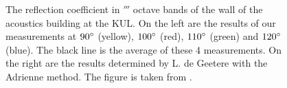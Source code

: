 \begin{figure}[h!]
  \centering
  \caption{The reflection coefficient in $\third$ octave bands of the wall of the acoustics building at the KUL. On the left are the results of our measurements at $90^{\circ}$ (yellow), $100^{\circ}$ (red), $110^{\circ}$ (green) and $120^{\circ}$ (blue). The black line is the average of these 4 measurements. On the right are the results determined by L. de Geetere with the Adrienne method. The figure is taken from \cite[p.68]{Geetere}.}
  \label{fig: reflection}
\end{figure}



%
